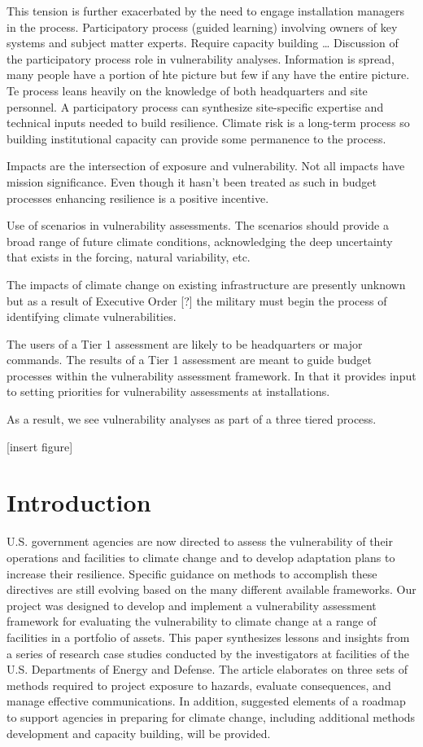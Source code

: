 \documentclass[10pt]{amsart}
\begin{document}
This tension is further exacerbated by the need to engage installation managers in the process.
Participatory process (guided learning) involving owners of key systems and subject matter experts.
Require capacity building \ldots
Discussion of the participatory process role in vulnerability analyses.
Information is spread, many people have a portion of hte picture but few if any have the entire picture.
Te process leans heavily on the knowledge of both headquarters and site personnel. 
A participatory process can synthesize site-specific expertise and technical inputs needed to build resilience. 
Climate risk is a long-term process so building institutional capacity can provide some permanence to the process.


Impacts are the intersection of exposure and vulnerability.
Not all impacts have mission significance. 
Even though it hasn't been treated as such in budget processes enhancing resilience is a positive incentive.

Use of scenarios in vulnerability assessments.
The scenarios should provide a broad range of future climate conditions, acknowledging the deep uncertainty that exists in the forcing, natural variability, etc. 


The impacts of climate change on existing infrastructure are presently unknown but as a result of Executive Order [?] the military must begin the process of identifying climate vulnerabilities. 

The users of a Tier 1 assessment are likely to be headquarters or major commands.
The results of a Tier 1 assessment are meant to guide budget processes within the vulnerability assessment framework.
In that it provides input to setting priorities for vulnerability assessments at installations.




As a result, we see vulnerability analyses as part of a three tiered process. 

[insert figure]


\section{Introduction}
U.S. government agencies are now directed to assess the vulnerability of their operations and facilities to climate change and to develop adaptation plans to increase their resilience. 
Specific guidance on methods to accomplish these directives are still evolving based on the many different available frameworks. 
Our project was designed to develop and implement a vulnerability assessment framework for evaluating the vulnerability to climate change at a range of facilities in a portfolio of assets. 
This paper synthesizes lessons and insights from a series of research case studies conducted by the investigators at facilities of the U.S. Departments of Energy and Defense. 
The article elaborates on three sets of methods required to project exposure to hazards, evaluate consequences, and manage effective communications. 
In addition, suggested elements of a roadmap to support agencies in preparing for climate change, including additional methods development and capacity building, will be provided.
\end{document}
